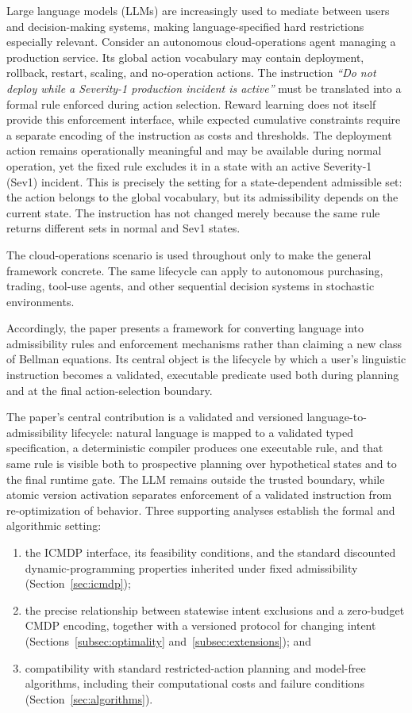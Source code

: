 \documentclass[journal]{IEEEtran}
\theoremstyle{definition}
\begin{document}
Large language models (LLMs) are increasingly used to mediate between users
and decision-making systems, making language-specified hard restrictions
especially relevant. Consider an autonomous cloud-operations agent managing a
production service. Its global action vocabulary may contain deployment,
rollback, restart, scaling, and no-operation actions. The instruction
\emph{``Do not deploy while a Severity-1 production incident is active''} must be
translated into a formal rule enforced during action selection. Reward
learning does not itself provide this enforcement interface, while expected
cumulative constraints require a separate encoding of the instruction as costs
and thresholds.
The deployment action remains operationally meaningful and may be
available during normal operation, yet the fixed rule excludes it in a state
with an active Severity-1 (Sev1) incident. This is precisely the setting for a
state-dependent admissible set: the action belongs to the global vocabulary,
but its admissibility depends on the current state. The instruction has not
changed merely because the same rule returns different sets in normal and
Sev1 states.

The cloud-operations scenario is used throughout only to make the
general framework concrete. The same lifecycle can apply to autonomous
purchasing, trading, tool-use agents, and other sequential decision systems 
in stochastic environments.

Accordingly, the paper presents a framework for converting language into
admissibility rules and enforcement mechanisms rather than claiming a new
class of Bellman equations. Its central object is the lifecycle by which a
user's linguistic instruction becomes a validated, executable predicate used
both during planning and at the final action-selection boundary.

The paper's central contribution is a validated and versioned
language-to-admissibility lifecycle: natural language is mapped to a validated
typed specification, a deterministic compiler produces one executable rule,
and that same rule is visible both to prospective planning over hypothetical
states and to the final runtime gate. The LLM remains outside the trusted
boundary, while atomic version activation separates enforcement of a validated
instruction from re-optimization of behavior. Three supporting
analyses establish the formal and algorithmic setting:
\begin{enumerate}[leftmargin=*, label=(\arabic*)]
  \item the ICMDP interface, its feasibility conditions, and the standard
  discounted dynamic-programming properties inherited under fixed
  admissibility (Section~\ref{sec:icmdp});
  \item the precise relationship between statewise intent exclusions and a
  zero-budget CMDP encoding, together with a versioned protocol for changing
  intent (Sections~\ref{subsec:optimality} and~\ref{subsec:extensions}); and
  \item compatibility with standard restricted-action planning and model-free
  algorithms, including their computational costs and failure conditions
  (Section~\ref{sec:algorithms}).
\end{enumerate}
\end{document}
